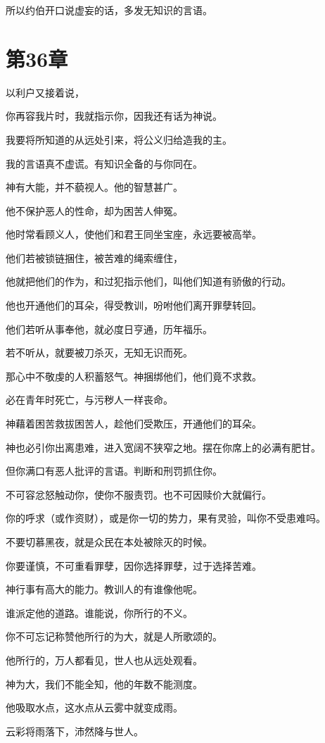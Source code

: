 \documentclass[12pt,oneside]{book}
\begin{document}
所以约伯开口说虚妄的话，多发无知识的言语。


\chapter{第36章}
以利户又接着说，

你再容我片时，我就指示你，因我还有话为神说。

我要将所知道的从远处引来，将公义归给造我的主。

我的言语真不虚谎。有知识全备的与你同在。

神有大能，并不藐视人。他的智慧甚广。

他不保护恶人的性命，却为困苦人伸冤。

他时常看顾义人，使他们和君王同坐宝座，永远要被高举。

他们若被锁链捆住，被苦难的绳索缠住，

他就把他们的作为，和过犯指示他们，叫他们知道有骄傲的行动。

他也开通他们的耳朵，得受教训，吩咐他们离开罪孽转回。

他们若听从事奉他，就必度日亨通，历年福乐。

若不听从，就要被刀杀灭，无知无识而死。

那心中不敬虔的人积蓄怒气。神捆绑他们，他们竟不求救。

必在青年时死亡，与污秽人一样丧命。

神藉着困苦救拔困苦人，趁他们受欺压，开通他们的耳朵。

神也必引你出离患难，进入宽阔不狭窄之地。摆在你席上的必满有肥甘。

但你满口有恶人批评的言语。判断和刑罚抓住你。

不可容忿怒触动你，使你不服责罚。也不可因赎价大就偏行。

你的呼求（或作资财），或是你一切的势力，果有灵验，叫你不受患难吗。

不要切慕黑夜，就是众民在本处被除灭的时候。

你要谨慎，不可重看罪孽，因你选择罪孽，过于选择苦难。

神行事有高大的能力。教训人的有谁像他呢。

谁派定他的道路。谁能说，你所行的不义。

你不可忘记称赞他所行的为大，就是人所歌颂的。

他所行的，万人都看见，世人也从远处观看。

神为大，我们不能全知，他的年数不能测度。

他吸取水点，这水点从云雾中就变成雨。

云彩将雨落下，沛然降与世人。
\end{document}
